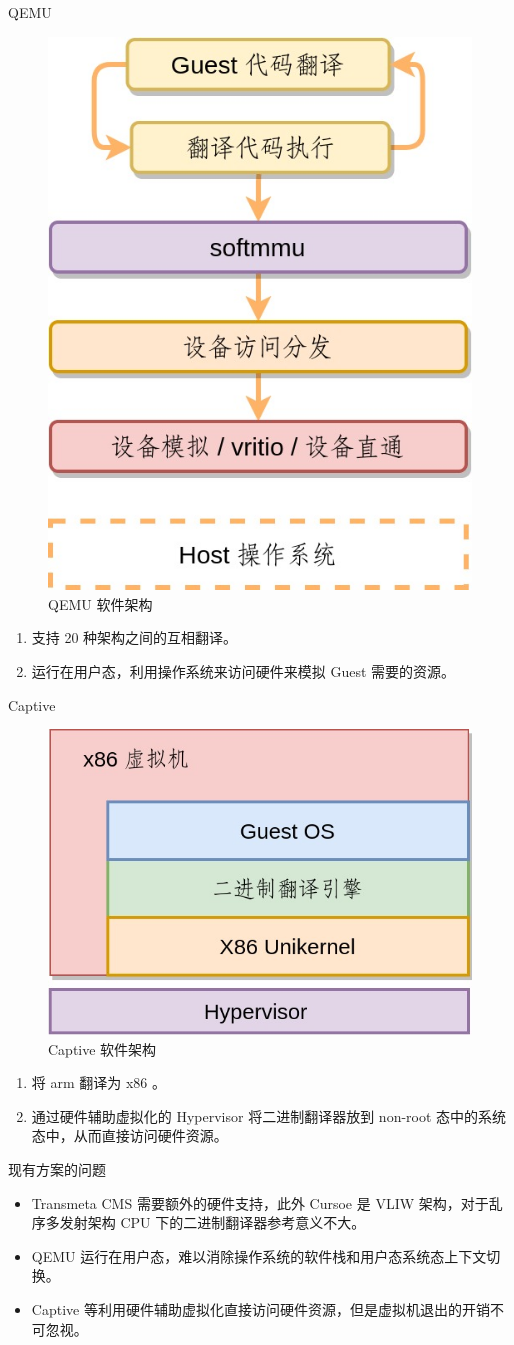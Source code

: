 \documentclass{beamer}
\begin{document}
\begin{frame}{QEMU}
	\begin{figure}
		\includegraphics[width=0.3\linewidth]{../paper/images/device-virtualization.jpg}
		\caption{QEMU 软件架构}
	\end{figure}
	\begin{enumerate}
		\item 支持 20 种架构之间的互相翻译。
		\item 运行在用户态，利用操作系统来访问硬件来模拟 Guest 需要的资源。
	\end{enumerate}
\end{frame}

\begin{frame}{Captive}
	\begin{figure}
		\includegraphics[width=0.5\linewidth]{../paper/images/captive.jpg}
		\caption{Captive 软件架构}
	\end{figure}
	\begin{enumerate}
		\item 将 arm 翻译为 x86 。
		\item 通过硬件辅助虚拟化的 Hypervisor 将二进制翻译器放到 non-root 态中的系统态中，从而直接访问硬件资源。
	\end{enumerate}
\end{frame}

\begin{frame}{现有方案的问题}
	\begin{itemize}
		\item Transmeta CMS 需要额外的硬件支持，此外 Cursoe 是 VLIW 架构，对于乱序多发射架构 CPU 下的二进制翻译器参考意义不大。
		\item QEMU 运行在用户态，难以消除操作系统的软件栈和用户态系统态上下文切换。
		\item Captive 等利用硬件辅助虚拟化直接访问硬件资源，但是虚拟机退出的开销不可忽视。
	\end{itemize}
\end{frame}
\end{document}
